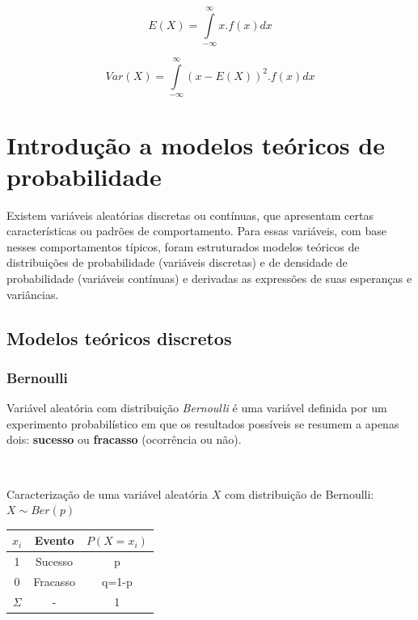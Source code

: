 \documentclass[
]{book}
\begin{document}
\hfill\break

\[
E(X) = \underset{-\infty }{\overset{\infty }{\int }}x.f\left(x\right)dx
\]

\hfill\break

\[
Var(X) = \underset{-\infty }{\overset{\infty }{\int }} (x-E(X))^{2}.f\left(x\right)dx
\]

\hypertarget{introduuxe7uxe3o-a-modelos-teuxf3ricos-de-probabilidade}{%
\chapter{Introdução a modelos teóricos de probabilidade}\label{introduuxe7uxe3o-a-modelos-teuxf3ricos-de-probabilidade}}

Existem variáveis aleatórias discretas ou contínuas, que apresentam certas características ou padrões de comportamento. Para essas variáveis, com base nesses comportamentos típicos, foram estruturados modelos teóricos de distribuições de probabilidade (variáveis discretas) e de densidade de probabilidade (variáveis contínuas) e derivadas as expressões de suas esperanças e variâncias.

\hypertarget{modelos-teuxf3ricos-discretos}{%
\section{Modelos teóricos discretos}\label{modelos-teuxf3ricos-discretos}}

\hypertarget{bernoulli}{%
\subsection{Bernoulli}\label{bernoulli}}

Variável aleatória com distribuição \emph{Bernoulli} é uma variável definida por um experimento probabilístico em que os resultados possíveis se resumem a apenas dois: \textbf{sucesso} ou \textbf{fracasso} (ocorrência ou não).

~

Caracterização de uma variável aleatória \(X\) com distribuição de Bernoulli: \(X\sim Ber(p)\)

\begin{table}[h]
\centering
\begin{tabular}{|c|c|c|}
\hline 
$x_{i}$ & Evento & $P(X=x_{i})$ \\ 
\hline 
1 & Sucesso & p \\ 
\hline 
0 & Fracasso & q=1-p \\ 
\hline 
$\Sigma$ & - & 1 \\ 
\hline 
\end{tabular} 
\end{table}
\end{document}
